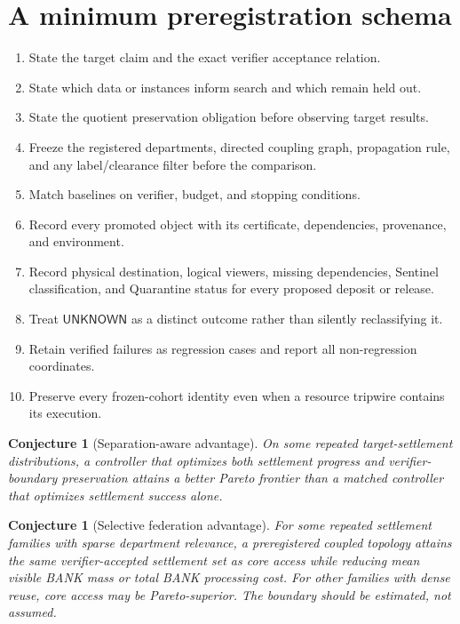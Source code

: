 \documentclass[11pt,oneside]{book}
\newtheorem{conjecture}[theorem]{Conjecture}
\theoremstyle{definition}
\theoremstyle{remark}
\newcommand{\UNKNOWN}{\mathsf{UNKNOWN}}
\begin{document}
\section{A minimum preregistration schema}
\begin{enumerate}[leftmargin=*]
\item State the target claim and the exact verifier acceptance relation.
\item State which data or instances inform search and which remain held out.
\item State the quotient preservation obligation before observing target results.
\item Freeze the registered departments, directed coupling graph, propagation rule, and any
label/clearance filter before the comparison.
\item Match baselines on verifier, budget, and stopping conditions.
\item Record every promoted object with its certificate, dependencies, provenance, and environment.
\item Record physical destination, logical viewers, missing dependencies, Sentinel classification,
and Quarantine status for every proposed deposit or release.
\item Treat \(\UNKNOWN\) as a distinct outcome rather than silently reclassifying it.
\item Retain verified failures as regression cases and report all non-regression coordinates.
\item Preserve every frozen-cohort identity even when a resource tripwire contains its execution.
\end{enumerate}

\begin{conjecture}[Separation-aware advantage]
On some repeated target-settlement distributions, a controller that optimizes both settlement progress
and verifier-boundary preservation attains a better Pareto frontier than a matched controller that
optimizes settlement success alone.
\end{conjecture}

\begin{conjecture}[Selective federation advantage]
For some repeated settlement families with sparse department relevance, a preregistered coupled
topology attains the same verifier-accepted settlement set as core access while reducing mean visible
BANK mass or total BANK processing cost. For other families with dense reuse, core access may be
Pareto-superior. The boundary should be estimated, not assumed.
\end{conjecture}
\end{document}
